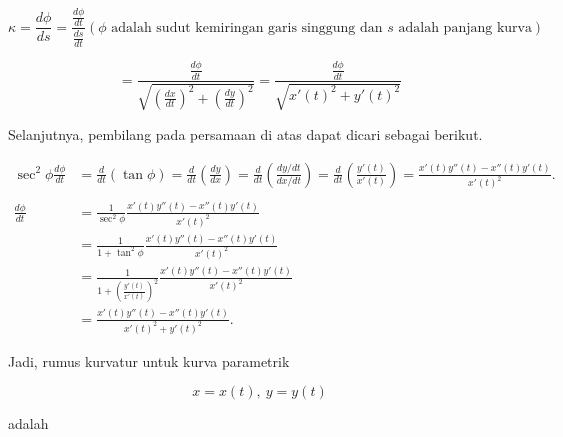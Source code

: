 \documentclass{article}
\begin{document}
\begin{eulernotebook}
\begin{eulercomment}
\begin{eulercomment}
\begin{eulercomment}
\begin{eulercomment}
\begin{eulercomment}
\begin{eulercomment}
\begin{eulercomment}
\begin{eulercomment}
\begin{eulercomment}
\begin{eulercomment}
\begin{eulercomment}
\begin{eulercomment}
\begin{eulercomment}
\begin{eulercomment}
\begin{eulercomment}
\begin{eulercomment}
\begin{eulercomment}
\begin{eulercomment}
\begin{eulercomment}
\begin{eulercomment}
\begin{eulercomment}
\begin{eulercomment}
\begin{eulercomment}
\end{eulercomment}
\begin{eulerformula}
\[
\kappa=\frac{d\phi}{ds}=\frac{\frac{d\phi}{dt}}{\frac{ds}{dt}}  (\phi \text{ adalah sudut kemiringan garis singgung dan } s \text{ adalah panjang kurva})
\]
\end{eulerformula}
\begin{eulercomment}
\end{eulercomment}
\begin{eulerformula}
\[
=\frac{\frac{d\phi}{dt}}{\sqrt{(\frac{dx}{dt})^2 + (\frac{dy}{dt})^2}} = \frac{\frac{d\phi}{dt}}{\sqrt{x'(t)^2+y'(t)^2}}
\]
\end{eulerformula}
\begin{eulercomment}
Selanjutnya, pembilang pada persamaan di atas dapat dicari sebagai
berikut.

\end{eulercomment}
\begin{eulerformula}
\[
\begin{aligned}\sec^2\phi\frac{d\phi}{dt} &= \frac{d}{dt}\left(\tan\phi\right)= \frac{d}{dt}\left(\frac{dy}{dx}\right)= \frac{d}{dt}\left(\frac{dy/dt}{dx/dt}\right)= \frac{d}{dt}\left(\frac{y'(t)}{x'(t)}\right)=\frac{x'(t)y''(t)-x''(t)y'(t)}{x'(t)^2}.\\ & \\ \frac{d\phi}{dt} &= \frac{1}{\sec^2\phi}\frac{x'(t)y''(t)-x''(t)y'(t)}{x'(t)^2}\\ &= \frac{1}{1+\tan^2\phi}\frac{x'(t)y''(t)-x''(t)y'(t)}{x'(t)^2}\\ &= \frac{1}{1+\left(\frac{y'(t)}{x'(t)}\right)^2}\frac{x'(t)y''(t)-x''(t)y'(t)}{x'(t)^2}\\ &= \frac{x'(t)y''(t)-x''(t)y'(t)}{x'(t)^2+y'(t)^2}.\end{aligned}
\]
\end{eulerformula}
\begin{eulercomment}
Jadi, rumus kurvatur untuk kurva parametrik

\end{eulercomment}
\begin{eulerformula}
\[
x=x(t),\ y=y(t)
\]
\end{eulerformula}
\begin{eulercomment}
adalah


\end{eulercomment}
\end{eulercomment}
\end{eulercomment}
\end{eulercomment}
\end{eulercomment}
\end{eulercomment}
\end{eulercomment}
\end{eulercomment}
\end{eulercomment}
\end{eulercomment}
\end{eulercomment}
\end{eulercomment}
\end{eulercomment}
\end{eulercomment}
\end{eulercomment}
\end{eulercomment}
\end{eulercomment}
\end{eulercomment}
\end{eulercomment}
\end{eulercomment}
\end{eulercomment}
\end{eulercomment}
\end{eulercomment}
\end{eulernotebook}
\end{document}
